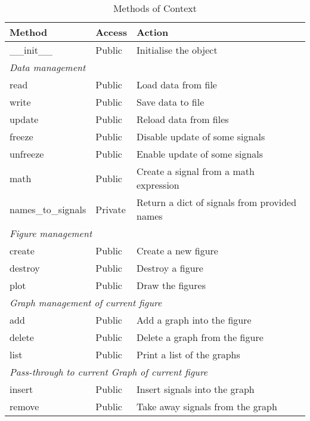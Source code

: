 \documentclass[a4paper,11pt]{article}
\begin{document}
\begin{table}[htbp]
  \centering\sf\small
  \begin{tabular}{lll}
    \hline
    Method & Access & Action \\
    \hline
    \_\_init\_\_ & Public & Initialise the object \\
    \multicolumn{3}{l}{\textit{Data management}} \\
    read & Public & Load data from file\\
    write &Public & Save data to file \\
    update & Public & Reload data from files\\
    freeze & Public & Disable update of some signals\\
    unfreeze & Public & Enable update of some signals\\
    math & Public & Create a signal from a math expression\\
    names\_to\_signals & Private & Return a dict of signals from provided names\\
    \multicolumn{3}{l}{\textit{Figure management}} \\
    create & Public & Create a new figure\\
    destroy & Public & Destroy a figure \\
    plot & Public & Draw the figures\\    
    \multicolumn{3}{l}{\textit{Graph management of current figure}} \\
    add & Public & Add a graph into the figure \\
    delete & Public & Delete a graph from the figure \\
    list & Public & Print a list of the graphs\\
    \multicolumn{3}{l}{\textit{Pass-through to current Graph of current figure}} \\
    insert & Public & Insert signals into the graph\\
    remove & Public & Take away signals from the graph\\
    \hline
  \end{tabular}
  \caption{Methods of Context}
  \label{tab:ctxt:meth}
\end{table}
\end{document}
